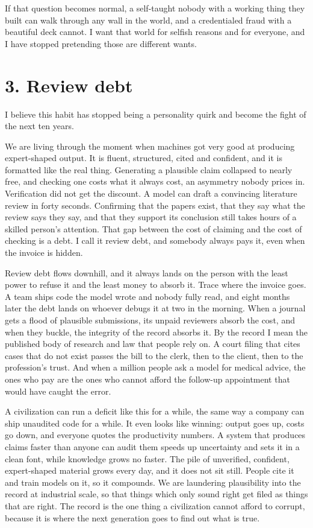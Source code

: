 \documentclass[11pt]{article}
\begin{document}
If that question becomes normal, a self-taught nobody with a working thing they built can walk through any wall in the world, and a credentialed fraud with a beautiful deck cannot. I want that world for selfish reasons and for everyone, and I have stopped pretending those are different wants.

\section*{3. Review debt}

I believe this habit has stopped being a personality quirk and become the fight of the next ten years.

We are living through the moment when machines got very good at producing expert-shaped output. It is fluent, structured, cited and confident, and it is formatted like the real thing. Generating a plausible claim collapsed to nearly free, and checking one costs what it always cost, an asymmetry nobody prices in. Verification did not get the discount. A model can draft a convincing literature review in forty seconds. Confirming that the papers exist, that they say what the review says they say, and that they support its conclusion still takes hours of a skilled person's attention. That gap between the cost of claiming and the cost of checking is a debt. I call it review debt, and somebody always pays it, even when the invoice is hidden.

Review debt flows downhill, and it always lands on the person with the least power to refuse it and the least money to absorb it. Trace where the invoice goes. A team ships code the model wrote and nobody fully read, and eight months later the debt lands on whoever debugs it at two in the morning. When a journal gets a flood of plausible submissions, its unpaid reviewers absorb the cost, and when they buckle, the integrity of the record absorbs it. By the record I mean the published body of research and law that people rely on. A court filing that cites cases that do not exist passes the bill to the clerk, then to the client, then to the profession's trust. And when a million people ask a model for medical advice, the ones who pay are the ones who cannot afford the follow-up appointment that would have caught the error.

A civilization can run a deficit like this for a while, the same way a company can ship unaudited code for a while. It even looks like winning: output goes up, costs go down, and everyone quotes the productivity numbers. A system that produces claims faster than anyone can audit them speeds up uncertainty and sets it in a clean font, while knowledge grows no faster. The pile of unverified, confident, expert-shaped material grows every day, and it does not sit still. People cite it and train models on it, so it compounds. We are laundering plausibility into the record at industrial scale, so that things which only sound right get filed as things that are right. The record is the one thing a civilization cannot afford to corrupt, because it is where the next generation goes to find out what is true.
\end{document}
